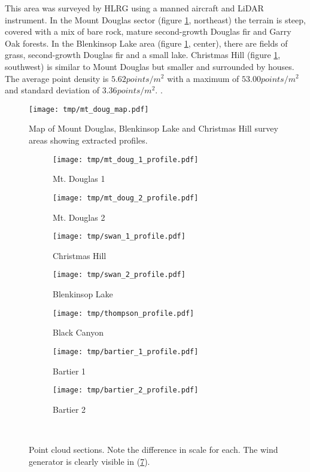 \documentclass[doc]{apa6}
\begin{document}
This area was surveyed by HLRG using a manned aircraft and LiDAR instrument. In the Mount Douglas sector (figure \ref{fig:mt_doug_map}, northeast) the terrain is steep, covered with a mix of bare rock, mature second-growth Douglas fir and Garry Oak forests. In the Blenkinsop Lake area (figure \ref{fig:mt_doug_map}, center), there are fields of grass, second-growth Douglas fir and a small lake. Christmas Hill (figure \ref{fig:mt_doug_map}, southwest) is similar to Mount Douglas but smaller and surrounded by houses. The average point density is $5.62points/m^2$ with a maximum of $53.00points/m^2$ and standard deviation of $3.36points/m^2$. .

\begin{figure} %
\texttt{[image: tmp/mt\_doug\_map.pdf]} 
\caption{Map of Mount Douglas, Blenkinsop Lake and Christmas Hill survey areas showing extracted profiles.}
\label{fig:mt_doug_map}
\end{figure}


\begin{figure} %
\begin{subfigure}[b]{\linewidth}
\texttt{[image: tmp/mt\_doug\_1\_profile.pdf]} 
\caption{Mt. Douglas 1} \label{subfig:mt_doug_1}
\end{subfigure}
\begin{subfigure}[b]{\linewidth}
\texttt{[image: tmp/mt\_doug\_2\_profile.pdf]} 
\caption{Mt. Douglas 2} \label{subfig:mt_doug_2}
\end{subfigure}
\begin{subfigure}[b]{\linewidth}
\texttt{[image: tmp/swan\_1\_profile.pdf]} 
\caption{Christmas Hill} \label{subfig:swan_1}
\end{subfigure}
\begin{subfigure}[b]{\linewidth}
\texttt{[image: tmp/swan\_2\_profile.pdf]} 
\caption{Blenkinsop Lake} \label{subfig:swan_2}
\end{subfigure}
\begin{subfigure}[b]{\linewidth}
\texttt{[image: tmp/thompson\_profile.pdf]} 
\caption{Black Canyon} \label{subfig:thompson}
\end{subfigure}
\begin{subfigure}[b]{\linewidth}
\texttt{[image: tmp/bartier\_1\_profile.pdf]} 
\caption{Bartier 1} \label{subfig:bartier_1}
\end{subfigure}
\begin{subfigure}[b]{\linewidth}
\texttt{[image: tmp/bartier\_2\_profile.pdf]} 
\caption{Bartier 2} \label{subfig:bartier_2}
\end{subfigure}
~
\caption{Point cloud sections. Note the difference in scale for each. The wind generator is clearly visible in (\ref{subfig:bartier_1}).}
\label{fig:profiles}
\end{figure}
\end{document}
